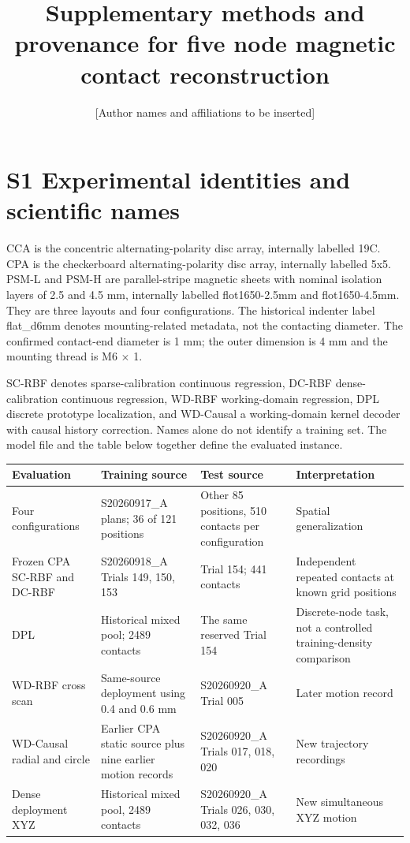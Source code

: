 \documentclass[preprint,12pt]{elsarticle}
\begin{document}
\begin{frontmatter}
\title{Supplementary methods and provenance for five node magnetic contact reconstruction}
\author{[Author names and affiliations to be inserted]}
\end{frontmatter}
\section{S1 Experimental identities and scientific names}

CCA is the concentric alternating-polarity disc array, internally labelled 19C. CPA is the checkerboard alternating-polarity disc array, internally labelled 5x5. PSM-L and PSM-H are parallel-stripe magnetic sheets with nominal isolation layers of 2.5 and 4.5 mm, internally labelled flot1650-2.5mm and flot1650-4.5mm. They are three layouts and four configurations. The historical indenter label flat\_d6mm denotes mounting-related metadata, not the contacting diameter. The confirmed contact-end diameter is 1 mm; the outer dimension is 4 mm and the mounting thread is M6 \ensuremath{\times} 1.

SC-RBF denotes sparse-calibration continuous regression, DC-RBF dense-calibration continuous regression, WD-RBF working-domain regression, DPL discrete prototype localization, and WD-Causal a working-domain kernel decoder with causal history correction. Names alone do not identify a training set. The model file and the table below together define the evaluated instance.

\begin{center}\small
\begin{tabularx}{\linewidth}{>{\raggedright\arraybackslash}X>{\raggedright\arraybackslash}X>{\raggedright\arraybackslash}X>{\raggedright\arraybackslash}X}
\toprule
Evaluation & Training source & Test source & Interpretation \\
\midrule
Four configurations & S20260917\_A plans; 36 of 121 positions & Other 85 positions, 510 contacts per configuration & Spatial generalization \\
Frozen CPA SC-RBF and DC-RBF & S20260918\_A Trials 149, 150, 153 & Trial 154; 441 contacts & Independent repeated contacts at known grid positions \\
DPL & Historical mixed pool; 2489 contacts & The same reserved Trial 154 & Discrete-node task, not a controlled training-density comparison \\
WD-RBF cross scan & Same-source deployment using 0.4 and 0.6 mm & S20260920\_A Trial 005 & Later motion record \\
WD-Causal radial and circle & Earlier CPA static source plus nine earlier motion records & S20260920\_A Trials 017, 018, 020 & New trajectory recordings \\
Dense deployment XYZ & Historical mixed pool, 2489 contacts & S20260920\_A Trials 026, 030, 032, 036 & New simultaneous XYZ motion \\
\bottomrule
\end{tabularx}\end{center}
\end{document}
